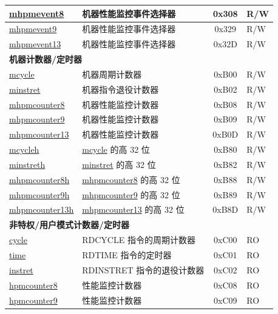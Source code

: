 \begin{longtable}{ | p{4.0cm} | p{8.4cm} | c | l | }
\hyperref[regdesc:MHPMEVENT8]{mhpmevent8} & 机器性能监控事件选择器 & 0x308 & R/W \\\hline
\hyperref[regdesc:MHPMEVENT9]{mhpmevent9} & 机器性能监控事件选择器 & 0x329& R/W \\\hline
\hyperref[regdesc:MHPMEVENT13]{mhpmevent13} & 机器性能监控事件选择器 & 0x32D & R/W \\\hline
\multicolumn{4}{|l|}{\textbf{机器计数器/定时器}} \\\hline
\hyperref[regdesc:MCYCLE]{mcycle} & 机器周期计数器 & 0xB00 & R/W \\\hline
\hyperref[regdesc:MINSTRET]{minstret} & 机器指令退役计数器 & 0xB02 & R/W \\\hline
\hyperref[regdesc:MHPMCOUNTER8]{mhpmcounter8} & 机器性能监控计数器 & 0xB08 & R/W \\\hline
\hyperref[regdesc:MHPMCOUNTER9]{mhpmcounter9} & 机器性能监控计数器 & 0xB09 & R/W \\\hline
\hyperref[regdesc:MHPMCOUNTER13]{mhpmcounter13} & 机器性能监控计数器 & 0xB0D & R/W \\\hline
\hyperref[regdesc:MCYCLEH]{mcycleh} & \hyperref[regdesc:MCYCLE]{mcycle} 的高 32 位 & 0xB80 & R/W \\\hline
\hyperref[regdesc:MINSTRETH]{minstreth} & \hyperref[regdesc:MINSTRET]{minstret} 的高 32 位 & 0xB82 & R/W \\\hline
\hyperref[regdesc:MHPMCOUNTER8H]{mhpmcounter8h} & \hyperref[regdesc:MHPMCOUNTER8]{mhpmcounter8} 的高 32 位 & 0xB88 & R/W \\\hline
\hyperref[regdesc:MHPMCOUNTER9H]{mhpmcounter9h} & \hyperref[regdesc:MHPMCOUNTER9]{mhpmcounter9} 的高 32 位 & 0xB89 & R/W \\\hline
\hyperref[regdesc:MHPMCOUNTER13H]{mhpmcounter13h} & \hyperref[regdesc:MHPMCOUNTER13]{mhpmcounter13} 的高 32 位 & 0xB8D & R/W \\\hline
\multicolumn{4}{|l|}{\textbf{非特权/用户模式计数器/定时器}} \\\hline
\hyperref[regdesc:CYCLE]{cycle} & RDCYCLE 指令的周期计数器 & 0xC00 & RO\\\hline
\hyperref[regdesc:TIME]{time} & RDTIME 指令的定时器 & 0xC01 & RO \\\hline
\hyperref[regdesc:INSTRET]{instret} & RDINSTRET 指令的退役计数器 & 0xC02 & RO \\\hline
\hyperref[regdesc:HPMCOUNTER8]{hpmcounter8} & 性能监控计数器 & 0xC08 & RO \\\hline
\hyperref[regdesc:HPMCOUNTER9]{hpmcounter9} & 性能监控计数器 & 0xC09 & RO \\\hline

\end{longtable}

